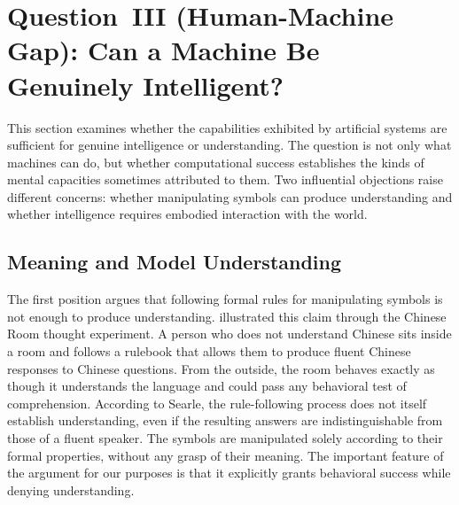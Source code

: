 \documentclass[acmsmall,screen,review,anonymous]{acmart}
\begin{document}
\section{Question~III (Human-Machine Gap): Can a Machine Be Genuinely Intelligent?}
\label{sec:poss}

This section examines whether the capabilities exhibited by artificial systems are sufficient for genuine intelligence or understanding.
%
The question is not only what machines can do, but whether computational success establishes the kinds of mental capacities sometimes attributed to them.
%
Two influential objections raise different concerns: whether manipulating symbols can produce understanding and whether intelligence requires embodied interaction with the world.


\subsection{Meaning and Model Understanding}
\label{subsec:understanding}
The first position argues that following formal rules for manipulating symbols is not enough to produce understanding. 
%
\citet{searle1980} illustrated this claim through the Chinese Room thought experiment. 
%
A person who does not understand Chinese sits inside a room and follows a rulebook that allows them to produce fluent Chinese responses to Chinese questions.
%
From the outside, the room behaves exactly as though it understands the language and could pass any behavioral test of comprehension. 
%
According to Searle, the rule-following process does not itself establish understanding, even if the resulting answers are indistinguishable from those of a fluent speaker.
%
The symbols are manipulated solely according to their formal properties, without any grasp of their meaning.
%
The important feature of the argument for our purposes is that it explicitly grants behavioral success while denying understanding.
\end{document}
